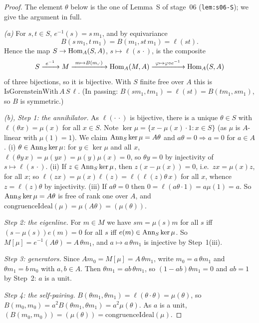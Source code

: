\begin{proof}
The element $\theta$ below is the one of Lemma~S of stage~06 (\texttt{lem:s06-S}); we give the argument in full.

\emph{(a)} For $s,t\in S$, $e^{-1}(s)=s\,m_1$, and by equivariance
\[B(s\,m_1,t\,m_1)=B(m_1,st\,m_1)=\ell(st).\]
Hence the map $S\to\operatorname{Hom}_A(S,A)$, $s\mapsto\ell(s\,\cdot)$, is the composite
\[S\xrightarrow{\ e^{-1}\ }M\xrightarrow{\ m\mapsto B(m,\cdot)\ }\Hom_A(M,A)\xrightarrow{\ \varphi\mapsto\varphi\circ e^{-1}\ }\Hom_A(S,A)\]
of three bijections, so it is bijective. With $S$ finite free over $A$ this is $\mathrm{IsGorensteinWith}\,A\,S\,\ell$. (In passing:
$B(sm_1,tm_1)=\ell(st)=B(tm_1,sm_1)$, so $B$ is symmetric.)

\emph{(b), Step 1: the annihilator.} As $\ell(\cdot\,\cdot)$ is bijective, there is a unique $\theta\in S$ with $\ell(\theta x)=\mu(x)$ for all
$x\in S$. Note $\ker\mu=\{x-\mu(x)\cdot1:x\in S\}$ (as $\mu$ is $A$-linear with $\mu(1)=1$). We claim $\operatorname{Ann}_S\ker\mu=A\theta$ and
$a\theta=0\Rightarrow a=0$ for $a\in A$.
(i) $\theta\in\operatorname{Ann}_S\ker\mu$: for $y\in\ker\mu$ and all $x$, $\ell(\theta y\,x)=\mu(yx)=\mu(y)\mu(x)=0$, so $\theta y=0$ by injectivity
of $s\mapsto\ell(s\,\cdot)$.
(ii) If $z\in\operatorname{Ann}_S\ker\mu$, then $z(x-\mu(x))=0$, i.e.\ $zx=\mu(x)z$, for all $x$; so $\ell(zx)=\mu(x)\ell(z)=\ell(\ell(z)\theta\,x)$ for all
$x$, whence $z=\ell(z)\theta$ by injectivity.
(iii) If $a\theta=0$ then $0=\ell(a\theta\cdot1)=a\mu(1)=a$.
So $\operatorname{Ann}_S\ker\mu=A\theta$ is free of rank one over $A$, and $\mathrm{congruenceIdeal}(\mu)=\mu(A\theta)=(\mu(\theta))$.

\emph{Step 2: the eigenline.} For $m\in M$ we have $sm=\mu(s)m$ for all $s$ iff $(s-\mu(s))e(m)=0$ for all $s$ iff
$e(m)\in\operatorname{Ann}_S\ker\mu$. So $M[\mu]=e^{-1}(A\theta)=A\,\theta m_1$, and $a\mapsto a\,\theta m_1$ is injective by Step~1(iii).

\emph{Step 3: generators.} Since $A m_0=M[\mu]=A\,\theta m_1$, write $m_0=a\,\theta m_1$ and $\theta m_1=b\,m_0$ with $a,b\in A$. Then
$\theta m_1=ab\,\theta m_1$, so $(1-ab)\theta m_1=0$ and $ab=1$ by Step~2: $a$ is a unit.

\emph{Step 4: the self-pairing.} $B(\theta m_1,\theta m_1)=\ell(\theta\cdot\theta)=\mu(\theta)$, so
$B(m_0,m_0)=a^2B(\theta m_1,\theta m_1)=a^2\mu(\theta)$. As $a$ is a unit, $(B(m_0,m_0))=(\mu(\theta))=\mathrm{congruenceIdeal}(\mu)$.
\end{proof}

